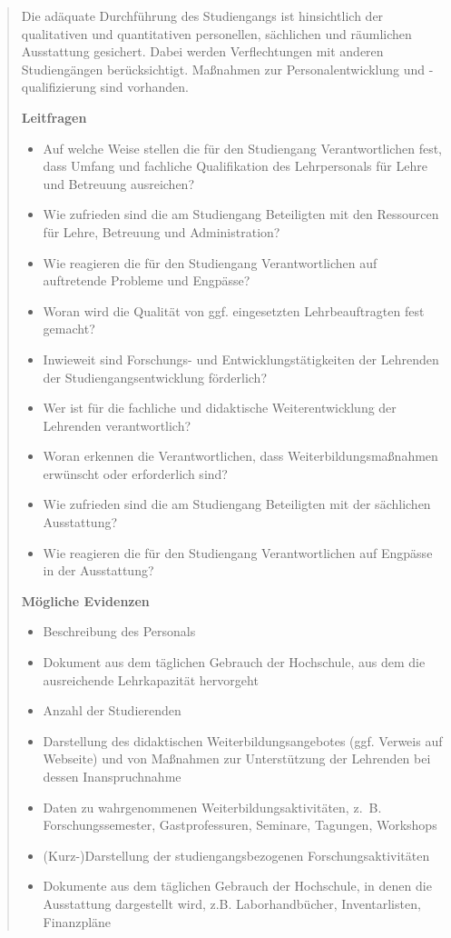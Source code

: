 \begin{quote}
Die adäquate Durchführung des Studiengangs ist hinsichtlich der
qualitativen und quantitativen personellen, sächlichen und räumlichen
Ausstattung gesichert. Dabei werden Verflechtungen mit anderen
Studiengängen berücksichtigt. Maßnahmen zur Personalentwicklung und
-qualifizierung sind vorhanden.

\textbf{Leitfragen}

\begin{itemize}
\item
  Auf welche Weise stellen die für den Studiengang Verantwortlichen
  fest, dass Umfang und fachliche Qualifikation des Lehrpersonals für
  Lehre und Betreuung ausreichen?
\item
  Wie zufrieden sind die am Studiengang Beteiligten mit den Ressourcen
  für Lehre, Betreuung und Administration?
\item
  Wie reagieren die für den Studiengang Verantwortlichen auf auftretende
  Probleme und Engpässe?
\item
  Woran wird die Qualität von ggf. eingesetzten Lehrbeauftragten fest
  gemacht?
\item
  Inwieweit sind Forschungs- und Entwicklungstätigkeiten der Lehrenden
  der Studiengangsentwicklung förderlich?
\item
  Wer ist für die fachliche und didaktische Weiterentwicklung der
  Lehrenden verantwortlich?
\item
  Woran erkennen die Verantwortlichen, dass Weiterbildungsmaßnahmen
  erwünscht oder erforderlich sind?
\item
  Wie zufrieden sind die am Studiengang Beteiligten mit der sächlichen
  Ausstattung?
\item
  Wie reagieren die für den Studiengang Verantwortlichen auf Engpässe in
  der Ausstattung?
\end{itemize}

\textbf{Mögliche Evidenzen}

\begin{itemize}
\item
  Beschreibung des Personals
\item
  Dokument aus dem täglichen Gebrauch der Hochschule, aus dem die
  ausreichende Lehrkapazität hervorgeht
\item
  Anzahl der Studierenden
\item
  Darstellung des didaktischen Weiterbildungsangebotes (ggf. Verweis auf
  Webseite) und von Maßnahmen zur Unterstützung der Lehrenden bei dessen
  Inanspruchnahme
\item
  Daten zu wahrgenommenen Weiterbildungsaktivitäten, z.~B.
  Forschungssemester, Gastprofessuren, Seminare, Tagungen, Workshops
\item
  (Kurz-)Darstellung der studiengangsbezogenen Forschungsaktivitäten
\item
  Dokumente aus dem täglichen Gebrauch der Hochschule, in denen die
  Ausstattung dargestellt wird, z.B. Laborhandbücher, Inventarlisten,
  Finanzpläne
\end{itemize}
\end{quote}

